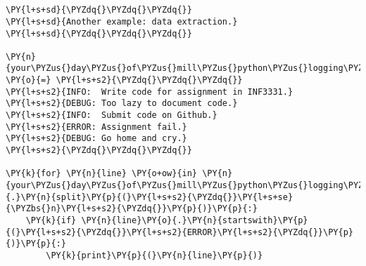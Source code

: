 

\section*{}

\begin{Verbatim}[commandchars=\\\{\}]
\PY{l+s+sd}{\PYZdq{}\PYZdq{}\PYZdq{}}
\PY{l+s+sd}{Another example: data extraction.}
\PY{l+s+sd}{\PYZdq{}\PYZdq{}\PYZdq{}}

\PY{n}{your\PYZus{}day\PYZus{}of\PYZus{}mill\PYZus{}python\PYZus{}logging\PYZus{}file} \PY{o}{=} \PY{l+s+s2}{\PYZdq{}\PYZdq{}\PYZdq{}}
\PY{l+s+s2}{INFO:  Write code for assignment in INF3331.}
\PY{l+s+s2}{DEBUG: Too lazy to document code.}
\PY{l+s+s2}{INFO:  Submit code on Github.}
\PY{l+s+s2}{ERROR: Assignment fail.}
\PY{l+s+s2}{DEBUG: Go home and cry.}
\PY{l+s+s2}{\PYZdq{}\PYZdq{}\PYZdq{}}

\PY{k}{for} \PY{n}{line} \PY{o+ow}{in} \PY{n}{your\PYZus{}day\PYZus{}of\PYZus{}mill\PYZus{}python\PYZus{}logging\PYZus{}file}\PY{o}{.}\PY{n}{split}\PY{p}{(}\PY{l+s+s2}{\PYZdq{}}\PY{l+s+se}{\PYZbs{}n}\PY{l+s+s2}{\PYZdq{}}\PY{p}{)}\PY{p}{:}
    \PY{k}{if} \PY{n}{line}\PY{o}{.}\PY{n}{startswith}\PY{p}{(}\PY{l+s+s2}{\PYZdq{}}\PY{l+s+s2}{ERROR}\PY{l+s+s2}{\PYZdq{}}\PY{p}{)}\PY{p}{:}
        \PY{k}{print}\PY{p}{(}\PY{n}{line}\PY{p}{)}
\end{Verbatim}
